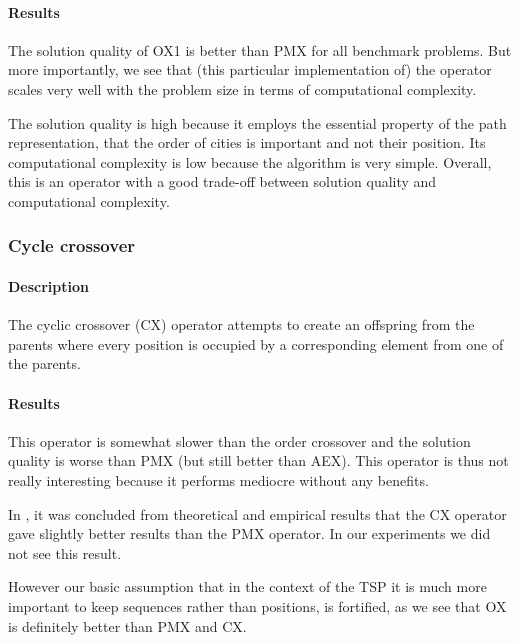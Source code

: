 ﻿\documentclass[a4paper,english,11pt,]{scrartcl}
\begin{document}
\paragraph{Results}
The solution quality of OX1 is better than PMX for all benchmark problems. But more importantly, we see that (this particular implementation of) the operator scales very well with the problem size in terms of computational complexity. 

The solution quality is high because it employs the essential property of the path representation, that the order of cities is important and not their position. Its computational complexity is low because the algorithm is very simple. Overall, this is an operator with a good trade-off between solution quality and computational complexity.
% 

\subsubsection{Cycle crossover}

\paragraph{Description}
The cyclic crossover (CX) operator attempts to create an offspring from the parents where every position is
occupied by a corresponding element from one of the parents.


\paragraph{Results}
This operator is somewhat slower than the order crossover and the solution quality is worse than PMX (but still better than AEX). This operator is thus not really interesting because it performs mediocre without any benefits.

In \cite{Oliver}, it was concluded from theoretical and empirical results
that the CX operator gave slightly better results than the PMX operator. 
In our experiments we did not see this result.

However our basic assumption that in the context of the TSP it is much more
important to keep sequences rather than positions, is fortified, as we see that OX is definitely better than PMX and CX.
\end{document}
